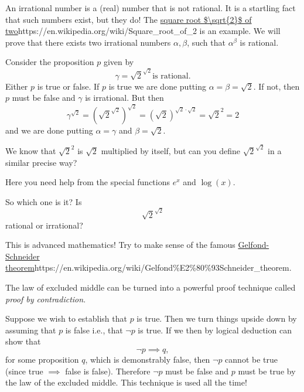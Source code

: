 \documentclass{article}
\begin{document}
\begin{example}
  An irrational number is a (real) number that is not rational. It is a
  startling fact that such numbers exist, but they do! The \url{square root $\sqrt{2}$ of two}{https://en.wikipedia.org/wiki/Square_root_of_2}
  is an example. 
  We will prove that there exists two irrational numbers $\alpha, \beta$, such that
$\alpha^\beta$ is rational.

  Consider the proposition $p$ given
  by
  $$
  \gamma = \sqrt{2}^{\sqrt{2}}\text{is rational.} %
  $$
  Either $p$ is true or false. If $p$ is true we are done putting $\alpha = \beta = \sqrt{2}$. If not, then
  $p$ must be false and $\gamma$ is irrational. But then
  $$
  \gamma^{\sqrt{2}} = \left(\sqrt{2}^{\sqrt{2}}\right)^{\sqrt{2}} = (\sqrt{2})^{\sqrt{2}\cdot \sqrt{2}} = \sqrt{2}^2 = 2
  $$
  and we are done putting $\alpha = \gamma$ and $\beta = \sqrt{2}$.
\end{example}

\beginshex
We know that $\sqrt{2}^2$ is $\sqrt{2}$ multiplied by itself, but can you define $\sqrt{2}^{\sqrt{2}}$ in a similar
precise way?

\begin{hint}[showhide]
  Here you need help from the special functions $e^x$ and $\log(x)$.
\end{hint}
\endshex

\beginshex
So which one is it? Is
$$
\sqrt{2}^{\sqrt{2}}
$$
rational or irrational? 

\begin{hint}[showhide]
  This is advanced mathematics! Try to make sense of the famous
  \url{Gelfond-Schneider theorem}{https://en.wikipedia.org/wiki/Gelfond\%E2\%80\%93Schneider_theorem}.
  \end{hint}
\endshex

The law of excluded middle can be turned
into a powerful proof technique called \emph{proof by contradiction}.

Suppose we wish to establish that $p$ is true. Then we turn things upside down by
assuming that $p$ is false i.e., that $\neg p$ is true. If we then
by logical deduction can show that
$$
\neg p \implies q,
$$
for some proposition $q$, which is demonstrably false, then $\neg p$ cannot be true (since
true $\implies$ false is false). Therefore $\neg p$
must be false and $p$ must be true by the law of the excluded middle. This technique is used all the time!
\end{document}
